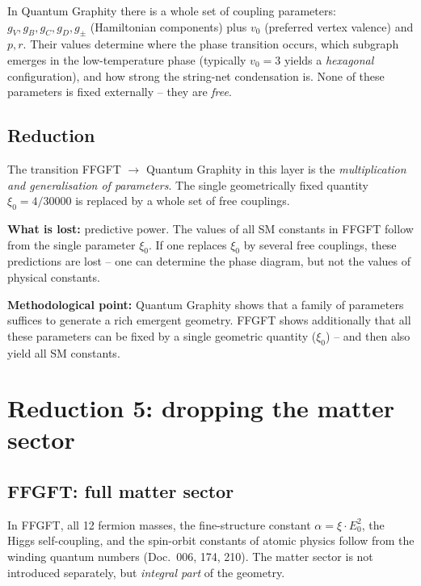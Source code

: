 In Quantum Graphity there is a whole set of coupling parameters:
$g_V, g_B, g_C, g_D, g_\pm$ (Hamiltonian components) plus $v_0$
(preferred vertex valence) and $p, r$. Their values determine where
the phase transition occurs, which subgraph emerges in the
low-temperature phase (typically $v_0 = 3$ yields a \emph{hexagonal}
configuration), and how strong the string-net condensation is.
None of these parameters is fixed externally -- they are \emph{free}.

\subsection{Reduction}

The transition FFGFT $\to$ Quantum Graphity in this layer is the
\emph{multiplication and generalisation of parameters}. The single
geometrically fixed quantity $\xi_0 = 4/30000$ is replaced by a
whole set of free couplings.

\textbf{What is lost:} predictive power. The values of all SM
constants in FFGFT follow from the single parameter $\xi_0$. If
one replaces $\xi_0$ by several free couplings, these predictions
are lost -- one can determine the phase diagram, but not the values
of physical constants.

\textbf{Methodological point:} Quantum Graphity shows that a family
of parameters suffices to generate a rich emergent geometry. FFGFT
shows additionally that all these parameters can be fixed by a
single geometric quantity ($\xi_0$) -- and then also yield all SM
constants.

\section{Reduction 5: dropping the matter sector}

\subsection{FFGFT: full matter sector}

In FFGFT, all 12 fermion masses, the fine-structure constant
$\alpha = \xi \cdot E_0^2$, the Higgs self-coupling, and the
spin-orbit constants of atomic physics follow from the winding
quantum numbers (Doc.~006, 174, 210). The matter sector is not
introduced separately, but \emph{integral part} of the geometry.

